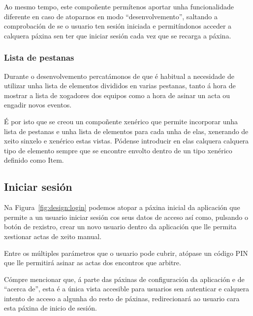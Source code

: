     Ao mesmo tempo, este compoñente permítenos aportar unha funcionalidade 
diferente en caso de atoparnos en modo ``desenvolvemento'', saltando a 
comprobación de se o usuario ten sesión iniciada e permitíndonos acceder a 
calquera páxina sen ter que iniciar sesión cada vez que se recarga a páxina.

      \subsubsection{Lista de pestanas}
      Durante o desenvolvemento percatámonos de que é habitual a necesidade de 
utilizar unha lista de elementos divididos en varias pestanas, tanto á hora de 
mostrar a lista de xogadores dos equipos como a hora de asinar un acta ou 
engadir novos eventos.

      É por isto que se creou un compoñente xenérico que permite incorporar 
unha lista de pestanas e unha lista de elementos para cada unha de elas, 
xenerando de xeito sinxelo e xenérico estas vistas. Pódense introducir 
en elas calquera calquera tipo de elemento sempre que se encontre envolto 
dentro de un tipo xenérico definido como Item.

    \subsection{Iniciar sesión}
    Na Figura~\ref{fig:design:login} podemos atopar a 
páxina inicial da aplicación que permite a un 
usuario iniciar sesión cos seus datos de acceso así como, pulsando o botón de 
rexistro, crear un novo usuario dentro da aplicación que lle permita xestionar
actas de xeito manual.

    Entre os múltiples parámetros que o usuario pode cubrir, atópase un código 
PIN que lle permitirá asinar as actas dos encontros que arbitre.

    Cómpre mencionar que, á parte das páxinas de configuración da aplicación e 
de ``acerca de'', esta é a única vista accesible para usuarios sen autenticar e 
calquera intento de acceso a algunha do resto de páxinas, redirecionará ao 
usuario cara esta páxina de inicio de sesión.

